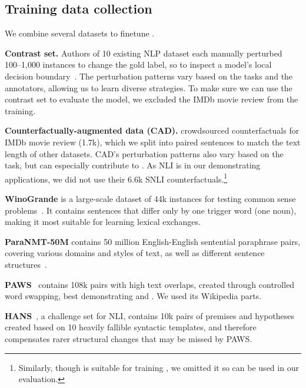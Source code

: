 \subsection{Training data collection}


We combine several datasets to finetune \sysname.

\textbf{Contrast set.}
Authors of 10 existing NLP dataset each manually perturbed 100--1,000 instances to change the gold label, so to inspect a model's local decision boundary~\cite{gardner2020contrast}.
The perturbation patterns vary based on the tasks and the annotators, allowing us to learn diverse strategies.
To make sure we can use the contrast set to evaluate the \sst model, we excluded the IMDb movie review from the training.


\textbf{Counterfactually-augmented data (CAD).}
\citet{kaushik2019learning} crowdsourced counterfactuals for IMDb movie review (1.7k), which we split into paired sentences to match the text length of other datasets.
CAD's perturbation patterns also vary based on the task, but can especially contribute to .
As NLI is in our demonstrating applications, we did not use their 6.6k SNLI counterfactuals.\footnote{Similarly, though \qqp is suitable for training \sysname, we omitted it so \qqp can be used in our evaluation.}


\textbf{WinoGrande} is a large-scale dataset of 44k instances for testing common sense problems~\cite{sakaguchi2019winogrande}.
It contains sentences that differ only by one trigger word (\eg one noun), making it most suitable for learning lexical exchanges.

\textbf{ParaNMT-50M} contains 50 million English-English sentential paraphrase pairs, covering various domains and styles of text, as well as different sentence structures~\cite{wieting2017paranmt}. 

\textbf{PAWS}~\cite{zhang2019paws} contains 108k pairs with high text overlaps, created through controlled word swapping, best demonstrating  and . We used its Wikipedia parts.


\textbf{HANS}~\cite{mccoy2019right}, a challenge set for NLI, contains 10k pairs of premises and hypotheses created based on 10 heavily fallible syntactic templates, and therefore compensates rarer structural changes that may be missed by PAWS.


